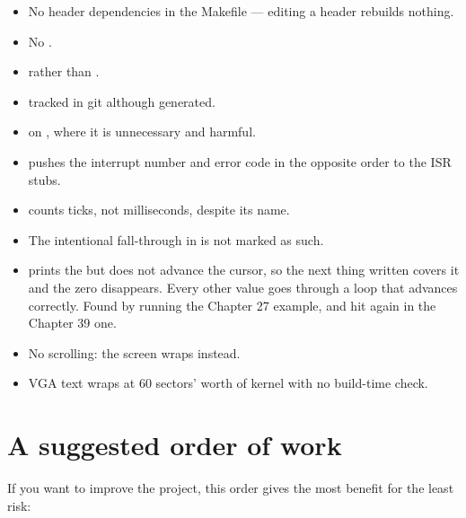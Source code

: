 \begin{itemize}
  \item No  header dependencies in the Makefile --- editing a header rebuilds nothing.
  \item No .
  \item {} rather than .
  \item {} tracked in git although generated.
  \item {} on , where it is unnecessary and harmful.
  \item {} pushes the interrupt number and error code in the opposite order to the
        ISR stubs.
  \item {} counts ticks, not milliseconds, despite its name.
  \item The intentional fall-through in  is not marked as such.
  \item {} prints the  but does not advance the cursor, so
        the next thing written covers it and the zero disappears. Every other value goes through a
        loop that advances correctly. Found by running the Chapter 27 example, and hit again in the
        Chapter 39 one.
  \item No scrolling: the screen wraps instead.
  \item VGA text wraps at 60 sectors' worth of kernel with no build-time check.
\end{itemize}

\section{A suggested order of work}

If you want to improve the project, this order gives the most benefit for the least risk:

